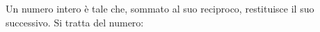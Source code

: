 Un numero intero è tale che, sommato al suo reciproco, 
restituisce il suo successivo. Si tratta del numero: